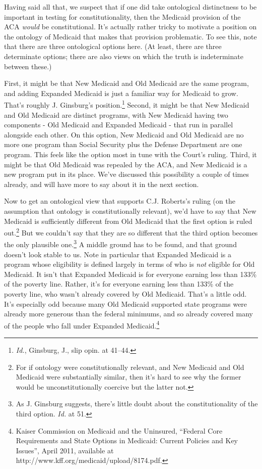 Having said all that, we suspect that if one did take ontological distinctness to be important in testing for constitutionality, then the Medicaid provision of the ACA \emph{would} be constitutional. It's actually rather tricky to motivate a position on the ontology of Medicaid that makes that provision problematic. To see this, note that there are three ontological options here. (At least, there are three determinate options; there are also views on which the truth is indeterminate between these.)

First, it might be that New Medicaid and Old Medicaid are the same program, and adding Expanded Medicaid is just a familiar way for Medicaid to grow. That's roughly J. Ginsburg's position.\footnote{\emph{Id.}, Ginsburg, J., slip opin. at 41--44.} Second, it might be that New Medicaid and Old Medicaid are distinct programs, with New Medicaid having two components - Old Medicaid and Expanded Medicaid - that run in parallel alongside each other. On this option, New Medicaid and Old Medicaid are no more one program than Social Security plus the Defense Department are one program. This feels like the option most in tune with the Court's ruling. Third, it might be that Old Medicaid was repealed by the ACA, and New Medicaid is a new program put in its place. We've discussed this possibility a couple of times already, and will have more to say about it in the next section.

Now to get an ontological view that supports C.J. Roberts's ruling (on the assumption that ontology is constitutionally relevant), we'd have to say that New Medicaid is sufficiently different from Old Medicaid that the first option is ruled out.\footnote{For if ontology were constitutionally relevant, and New Medicaid and Old Medicaid were substantially similar, then it's hard to see why the former would be unconstitutionally coercive but the latter not.} But we couldn't say that they are so different that the third option becomes the only plausible one.\footnote{As J. Ginsburg suggests, there's little doubt about the constitutionality of the third option. \emph{Id.} at 51.} A middle ground has to be found, and that ground doesn't look stable to us. Note in particular that Expanded Medicaid is a program whose eligibility is defined largely in terms of who is \emph{not} eligible for Old Medicaid. It isn't that Expanded Medicaid is for everyone earning less than 133\% of the poverty line. Rather, it's for everyone earning less than 133\% of the poverty line, who wasn't already covered by Old Medicaid. That's a little odd. It's especially odd because many Old Medicaid supported state programs were already more generous than the federal minimums, and so already covered many of the people who fall under Expanded Medicaid.\footnote{Kaiser Commission on Medicaid and the Uninsured, ``Federal Core Requirements and State Options in Medicaid: Current Policies and Key Issues'', April 2011, available at http:/\slash www.kff.org\slash medicaid\slash upload\slash 8174.pdf.}

